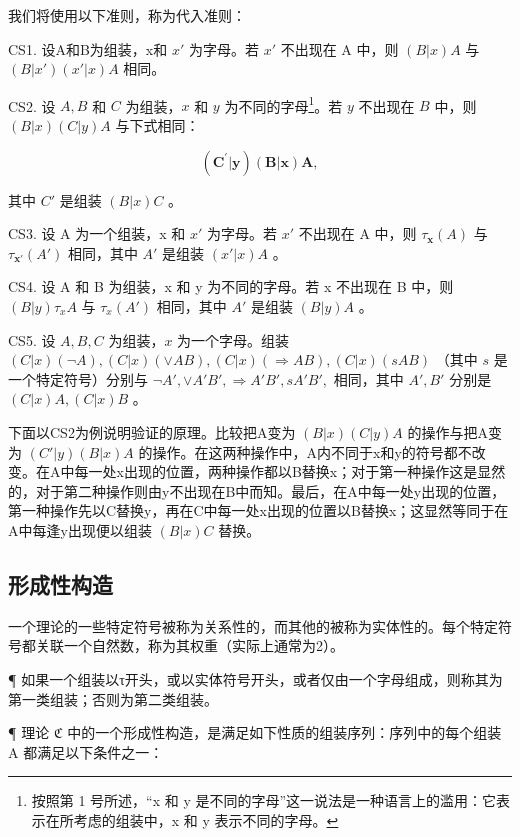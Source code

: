 我们将使用以下准则，称为代入准则：

CS1. 设A和B为组装，x和 \(x'\) 为字母。若 \(x'\) 不出现在 A 中，则 \((B|x)A\) 与 \((B|x')(x'|x)A\) 相同。

CS2. 设 \(A, B\) 和 \(C\) 为组装，\(x\) 和 \(y\) 为不同的字母\footnote{按照第 1 号所述，“x 和 y 是不同的字母”这一说法是一种语言上的滥用：它表示在所考虑的组装中，x 和 y 表示不同的字母。}。若 \(y\) 不出现在 \(B\) 中，则 \((B|x)(C|y)A\) 与下式相同：

\[
\left(\boldsymbol {C} ^ {\prime} | \boldsymbol {y}\right) (\boldsymbol {B} | \boldsymbol {x}) \boldsymbol {A},
\]

其中 \(C'\) 是组装 \((B|x)C\) 。

CS3. 设 A 为一个组装，x 和 \(x'\) 为字母。若 \(x'\) 不出现在 A 中，则 \(\tau_{\mathbf{x}}(A)\) 与 \(\tau_{\mathbf{x}'}(A')\) 相同，其中 \(A'\) 是组装 \((x'|x)A\) 。

CS4. 设 A 和 B 为组装，x 和 y 为不同的字母。若 x 不出现在 B 中，则 \((B|y)\tau_{x}A\) 与 \(\tau_{x}(A')\) 相同，其中 \(A'\) 是组装 \((B|y)A\) 。

CS5. 设 \(A, B, C\) 为组装，\(x\) 为一个字母。组装 \((C|x) (\neg A), (C|x) (\vee AB), (C|x) (\Longrightarrow AB), (C|x) (sAB)\) （其中 \(s\) 是一个特定符号）分别与 \(\neg A', \vee A'B', \Longrightarrow A'B', sA'B',\) 相同，其中 \(A', B'\) 分别是 \((C|x) A, (C|x) B\) 。

下面以CS2为例说明验证的原理。比较把A变为 \((B|x)(C|y)A\) 的操作与把A变为 \((C'|y)(B|x)A\) 的操作。在这两种操作中，A内不同于x和y的符号都不改变。在A中每一处x出现的位置，两种操作都以B替换x；对于第一种操作这是显然的，对于第二种操作则由y不出现在B中而知。最后，在A中每一处y出现的位置，第一种操作先以C替换y，再在C中每一处x出现的位置以B替换x；这显然等同于在A中每逢y出现便以组装 \((B|x)C\) 替换。

\subsection{形成性构造}

一个理论的一些特定符号被称为关系性的，而其他的被称为实体性的。每个特定符号都关联一个自然数，称为其权重（实际上通常为2）。

¶ 如果一个组装以τ开头，或以实体符号开头，或者仅由一个字母组成，则称其为第一类组装；否则为第二类组装。

¶ 理论 \(\mathfrak{C}\) 中的一个形成性构造，是满足如下性质的组装序列：序列中的每个组装 A 都满足以下条件之一：

